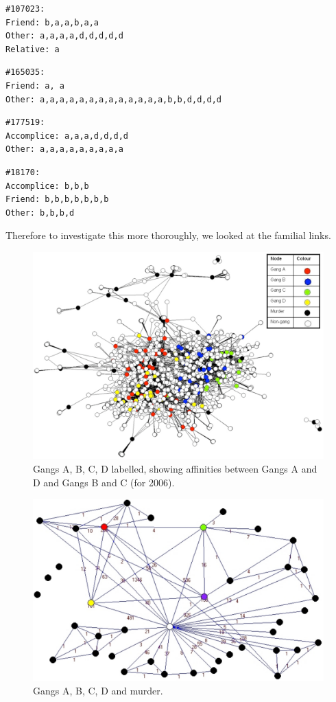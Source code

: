 \documentclass[twocolumn]{svjour3}          %
\theoremstyle{definition}
\begin{document}
\begin{verbatim}
#107023: 
Friend: b,a,a,b,a,a
Other: a,a,a,a,d,d,d,d,d
Relative: a
\end{verbatim}

\begin{verbatim}
#165035:
Friend: a, a
Other: a,a,a,a,a,a,a,a,a,a,a,a,a,b,b,d,d,d,d
\end{verbatim}

\begin{verbatim}
#177519:
Accomplice: a,a,a,d,d,d,d
Other: a,a,a,a,a,a,a,a,a
\end{verbatim}

\begin{verbatim}
#18170:
Accomplice: b,b,b				
Friend: b,b,b,b,b,b,b
Other: b,b,b,d
\end{verbatim}

Therefore to investigate this more thoroughly, we looked at the
familial links.

\begin{figure}[!ht]
\centering
\includegraphics[width=\columnwidth]{images/legend2006}
\caption{Gangs A, B, C, D labelled, showing affinities between Gangs A
  and D and Gangs B and C (for 2006).}
\label{fig:legend2006} 
\end{figure}

\begin{figure}[!ht]
\centering
\includegraphics[width=\columnwidth]{images/murdershrink.pdf}
\caption{Gangs A, B, C, D and murder.}
\label{fig:murdershrink} 
\end{figure}
\end{document}

